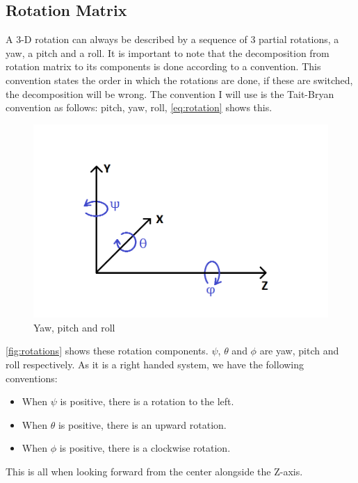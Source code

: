 \subsection{Rotation Matrix}\label{ssec:rotmat}
A 3-D rotation can always be described by a sequence of 3 partial rotations, a yaw, a pitch and a roll. It is important to note that the decomposition from rotation matrix to its components is done according to a convention. This convention states the order in which the rotations are done, if these are switched, the decomposition will be wrong. The convention I will use is the Tait-Bryan convention as follows: pitch, yaw, roll, \autoref{eq:rotation} shows this.\bigskip
\begin{figure}
    \centering
    \includegraphics[width=1\textwidth]{figures/yaw_pitch_roll.png}
    \caption{Yaw, pitch and roll}
    \label{fig:rotations}
\end{figure}

\autoref{fig:rotations} shows these rotation components. $\psi$, $\theta$ and $\phi$ are yaw, pitch and roll respectively. As it is a right handed system, we have the following conventions:
\begin{itemize}
    \item When $\psi$ is positive, there is a rotation to the left.
    \item When $\theta$ is positive, there is an upward rotation.
    \item When $\phi$ is positive, there is a clockwise rotation.
\end{itemize}
This is all when looking forward from the center alongside the Z-axis.\bigskip

